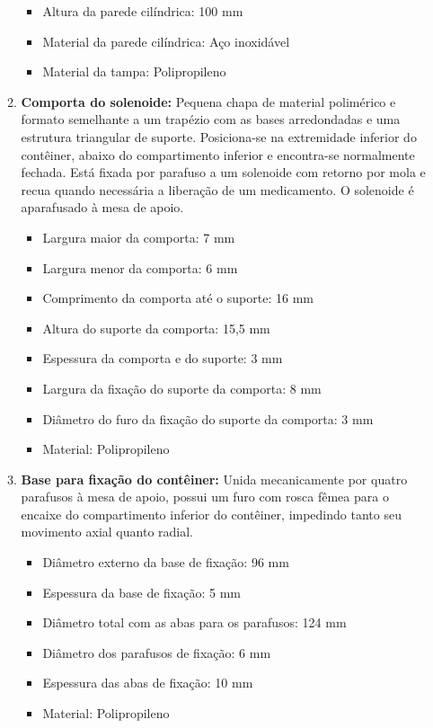 \begin{enumerate}
\begin{enumerate}
\begin{itemize}
        \item Altura da parede cilíndrica: 100 mm
         \item Material da parede cilíndrica: Aço inoxidável
         \item Material da tampa: Polipropileno
    \end{itemize}
    \item \textbf{Comporta do solenoide:} Pequena chapa de material polimérico e formato semelhante a um trapézio com as bases arredondadas e uma estrutura triangular de suporte. Posiciona-se na extremidade inferior do contêiner, abaixo do compartimento inferior e encontra-se normalmente fechada. Está fixada por parafuso a um solenoide com retorno por mola e recua quando necessária a liberação de um medicamento. O solenoide é aparafusado à mesa de apoio.
    \begin{itemize}
        \item Largura maior da comporta: 7 mm
        \item Largura menor da comporta: 6 mm
        \item Comprimento da comporta até o suporte: 16 mm
        \item Altura do suporte da comporta: 15,5 mm
        \item Espessura da comporta e do suporte: 3 mm
        \item Largura da fixação do suporte da comporta: 8 mm
        \item Diâmetro do furo da fixação do suporte da comporta: 3 mm
        \item Material: Polipropileno
    \end{itemize}
    \item \textbf{Base para fixação do contêiner:} Unida mecanicamente por quatro parafusos à mesa de apoio, possui um furo com rosca fêmea para o encaixe do compartimento inferior do contêiner, impedindo tanto seu movimento axial quanto radial.
    \begin{itemize}
        \item Diâmetro externo da base de fixação: 96 mm
        \item Espessura da base de fixação: 5 mm
        \item Diâmetro total com as abas para os parafusos: 124 mm
        \item Diâmetro dos parafusos de fixação: 6 mm
        \item Espessura das abas de fixação: 10 mm
        \item Material: Polipropileno

\end{itemize}
\end{enumerate}
\end{enumerate}
